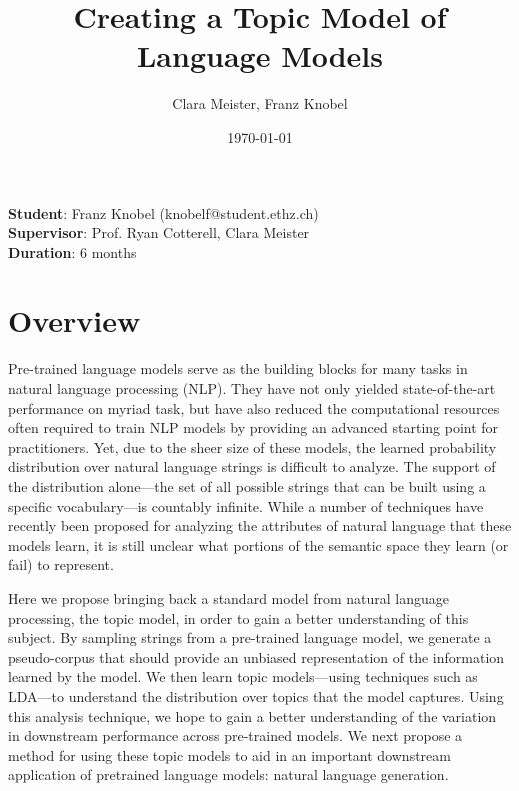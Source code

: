 \documentclass{article}
\title{Creating a Topic Model of Language Models}
\date{\today}
\author{Clara Meister, Franz Knobel}
\begin{document}
\newcommand{\polylog}[0]{~\text{polylog}}
\newcommand{\poly}[0]{~\text{poly}}
	
\maketitle

\begin{flushleft}
\textbf{Student}: Franz Knobel (knobelf@student.ethz.ch) \\
\textbf{Supervisor}: Prof. Ryan Cotterell, Clara Meister \\
\textbf{Duration}: 6 months
\end{flushleft}

\section{Overview}
Pre-trained language models serve as the building blocks for many tasks in natural language processing (NLP). 
They have not only yielded state-of-the-art performance on myriad task, but have also reduced the computational resources often required to train NLP models by providing an advanced starting point for practitioners. Yet, due to the sheer size of these models, the learned probability distribution over natural language strings is difficult to analyze. The support of the distribution alone---the set of all possible strings that can be built using a specific vocabulary---is countably infinite. While a number of techniques have recently been proposed for analyzing the attributes of natural language that these models learn, it is still unclear what portions of the semantic space they learn (or fail) to represent.


Here we propose bringing back a standard model from natural language processing, the topic model, in order to gain a better understanding of this subject. By sampling strings from a pre-trained language model, we generate a pseudo-corpus that should provide an unbiased representation of the information learned by the model. We then learn topic models---using techniques such as LDA---to understand the distribution over topics that the model captures. Using this analysis technique, we hope to gain a better understanding of the variation in downstream performance across pre-trained models. We next propose a method for using these topic models to aid in an important downstream application of pretrained language models: natural language generation.
\end{document}

